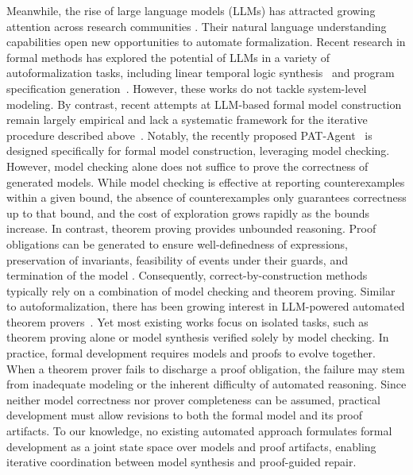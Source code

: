Meanwhile, the rise of large language models (LLMs) \cite{achiam2023gpt, openai_gpt5} has attracted growing attention across research communities \cite{jiang2024survey, hou2024large, zhang2025position}. 
Their natural language understanding capabilities open new opportunities to automate formalization. 
Recent research in formal methods has explored the potential of LLMs in a variety of autoformalization tasks, including linear temporal logic synthesis~\cite{cosler2023nl2spec, fuggitti2023nl2ltl} and program specification generation~\cite{wen2024enchanting, wu2023lemur}. 
However, these works do not tackle system-level modeling. 
By contrast, recent attempts at LLM-based formal model construction remain largely empirical and lack a systematic framework for the iterative procedure described above~\cite{hong2025effectiveness, capozucca2025ai}. 
Notably, the recently proposed PAT-Agent~\cite{zuo2025pat} is designed specifically for formal model construction, leveraging model checking. 
However, model checking alone does not suffice to prove the correctness of generated models. 
While model checking is effective at reporting counterexamples within a given bound, the absence of counterexamples only guarantees correctness up to that bound, and the cost of exploration grows rapidly as the bounds increase.
In contrast, theorem proving provides unbounded reasoning.
Proof obligations can be generated to ensure well-definedness of expressions, preservation of invariants, feasibility of events under their guards, and termination of the model \cite{abrial1996b}.
Consequently, correct-by-construction methods typically rely on a combination of model checking and theorem proving.
Similar to autoformalization, there has been growing interest in LLM-powered automated theorem provers~\cite{first2023baldur, lu2024proof, carrott2024coqpyt}. 
Yet most existing works focus on isolated tasks, such as theorem proving alone or model synthesis verified solely by model checking.
In practice, formal development requires models and proofs to evolve together.
When a theorem prover fails to discharge a proof obligation, the failure may stem from inadequate modeling or the inherent difficulty of automated reasoning.
Since neither model correctness nor prover completeness can be assumed, practical development must allow revisions to both the formal model and its proof artifacts.
To our knowledge, no existing automated approach formulates formal development as a joint state space over models and proof artifacts, enabling iterative coordination between model synthesis and proof-guided repair.

